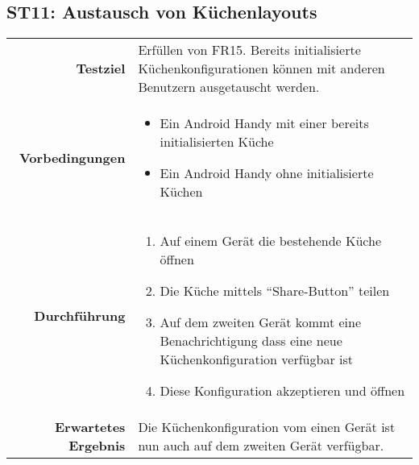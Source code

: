 \subsection{ST11: Austausch von Küchenlayouts}
\begin{table}[H]
\begin{tabularx}{\textwidth}{r X }
\textbf{Testziel} & Erfüllen von \ac{FR}15. Bereits initialisierte Küchenkonfigurationen können mit anderen Benutzern ausgetauscht werden. \\
\textbf{Vorbedingungen} & \begin{itemize}
\item Ein Android Handy mit einer bereits initialisierten Küche
\item Ein Android Handy ohne initialisierte Küchen
\end{itemize} \\
\textbf{Durchführung} & \begin{enumerate}
\item Auf einem Gerät die bestehende Küche öffnen
\item Die Küche mittels \enquote{Share-Button} teilen
\item Auf dem zweiten Gerät kommt eine Benachrichtigung dass eine neue Küchenkonfiguration verfügbar ist
\item Diese Konfiguration akzeptieren und öffnen
\end{enumerate} \\
\textbf{Erwartetes Ergebnis} & Die Küchenkonfiguration vom einen Gerät ist nun auch auf dem zweiten Gerät verfügbar.\\
\end{tabularx}
\end{table}

